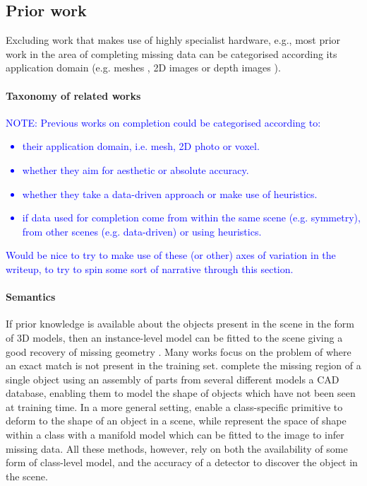 \documentclass[10pt,twocolumn,letterpaper]{article}
\makeatletter
\renewcommand*{\eg}{e.g.\@\xspace}
\renewcommand*{\ie}{i.e.\@\xspace}
\newcommand{\note}[1]{\textcolor{blue}{NOTE: #1}}
\makeatother
\begin{document}
\subsection{Prior work}

Excluding work that makes use of highly specialist hardware, \eg \cite{velten-nature-2012}, most prior work in the area of completing missing data can be categorised according its application domain (\eg meshes \cite{schnabel-eurographics-2009, ju-cst-2009}, 2D images \cite{gupta-cvpr-2011} or depth images \cite{shen-tog-2012}).

\paragraph{Taxonomy of related works}
\note{
Previous works on completion could be categorised according to:
\begin{itemize}
\item their application domain, \ie mesh, 2D photo or voxel. 
\item whether they aim for aesthetic or absolute accuracy.
\item whether they take a data-driven approach or make use of heuristics.
\item if data used for completion come from within the same scene (\eg symmetry), from other scenes (\eg data-driven) or using heuristics.
\end{itemize}
Would be nice to try to make use of these (or other) axes of variation in the writeup, to try to spin some sort of narrative through this section.
}

\paragraph{Semantics}
If prior knowledge is available about the objects present in the scene in the form of 3D models, then an instance-level model can be fitted to the scene giving a good recovery of missing geometry \cite{hinterstoisser-accv-2012, drost-3dimpvt-2012, rusu-iros-2010}.
Many works focus on the problem of where an exact match is not present in the training set.
\cite{shen-tog-2012} complete the missing region of a single object using an assembly of parts from several different models a CAD database, enabling them to model the shape of objects which have not been seen at training time.
In a more general setting, \cite{cocias-cgvcv-2013} enable a class-specific primitive to deform to the shape of an object in a scene, while \cite{prisacariu-iccv-2011} represent the space of shape within a class with a manifold model which can be fitted to the image to infer missing data.
All these methods, however, rely on both the availability of some form of class-level model, and the accuracy of a detector to discover the object in the scene.
\end{document}
